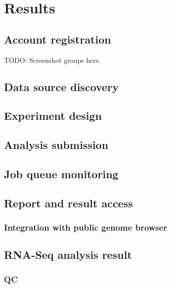 \chapter{Results}
\label{c:result}

\section{Account registration}

TODO: Screenshot groups here.

\section{Data source discovery}


\section{Experiment design}


\section{Analysis submission}


\section{Job queue monitoring}


\section{Report and result access}

\subsection{Integration with public genome browser}


\section{RNA-Seq analysis result}

\subsection{QC}


